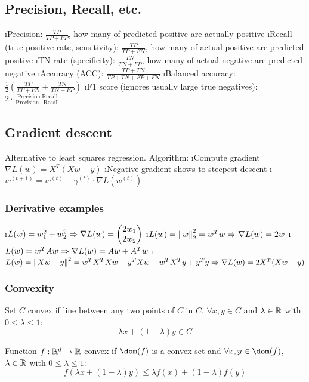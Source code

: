 \subsection{Precision, Recall, etc.}

\bi
\i Precision: $\frac{TP}{TP + FP}$, how many of predicted positive are actually positive
\i Recall (true positive rate, sensitivity): $\frac{TP}{TP + FN}$, how many of actual positive are predicted positive
\i TN rate (specificity): $\frac{TN}{TN + FP}$, how many of actual negative are predicted negative
\i Accuracy (ACC): $\frac{TP + TN}{TP + TN + FP + FN}$
\i Balanced accuracy: $\frac{1}{2} \left( \frac{TP}{TP + FN} + \frac{TN}{TN + FP} \right)$
\i F1 score (ignores usually large true negatives): $2 \cdot \frac{\text{Precision} \cdot \text{Recall}}{\text{Precision} + \text{Recall}}$ 
\ei

\subsection{Gradient descent}
Alternative to least squares regression. Algorithm:
\be
\i Compute gradient $\nabla L(w) = X^T(Xw-y)$
\i Negative gradient shows to steepest descent
\i $w^{(t+1)} = w^{(t)} - \gamma^{(t)} \cdot \nabla L(w^{(t)})$
\ee

\subsubsection{Derivative examples}

\bi
\i $L(w) = w_1^2 + w_2^2 \\\Rightarrow \nabla L(w) = \begin{pmatrix} 2w_1\\2w_2 \end{pmatrix}$
\i $L(w) = \left\lVert w\right\rVert ^2_2 = w^Tw \\\Rightarrow \nabla L(w) = 2w$
\i $L(w) = w^TAw \\\Rightarrow \nabla L(w) = Aw + A^Tw$
\i $L(w) = \left\lVert Xw-y\right\rVert^2 = w^TX^TXw - y^TXw - w^TX^Ty + y^Ty \\\Rightarrow \nabla L(w) = 2X^T(Xw - y)$
\ei

\subsubsection{Convexity}

Set $C$ convex if line between any two points of $C$ in $C$. $\forall x,y \in C$ and $\lambda \in \mathbb{R}$ with $0 \leq \lambda \leq 1$: \[\lambda x + (1 - \lambda) y \in C\]

Function $f: \mathbb{R}^d \to \mathbb{R}$ convex if $\dom(f)$ is a convex set and $\forall x,y \in \dom(f)$, $\lambda \in \mathbb{R}$ with $0 \leq \lambda \leq 1$: \[f(\lambda x + (1 - \lambda) y) \leq \lambda f(x) + (1 - \lambda) f(y)\]


